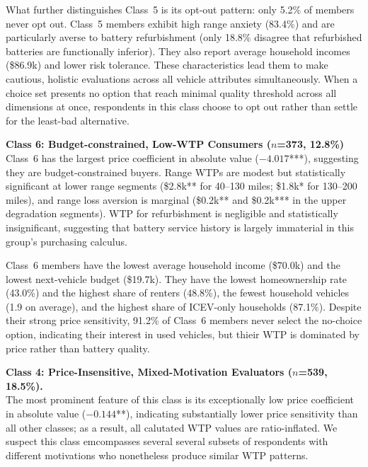 \documentclass[a4paper,fleqn]{cas-sc}   %
\begin{document}
What further distinguishes Class~5 is its opt-out pattern: only 5.2\% of members never opt out. Class~5 members exhibit high range anxiety (83.4\%) and are particularly averse to battery refurbishment (only 18.8\% disagree that refurbished batteries are functionally inferior). They also report average household incomes (\$86.9k) and lower risk tolerance. These characteristics lead them to make cautious, holistic evaluations across all vehicle attributes simultaneously. When a choice set presents no option that reach minimal quality threshold across all dimensions at once, respondents in this class choose to opt out rather than settle for the least-bad alternative.

\medskip

\noindent\textbf{Class 6: Budget-constrained, Low-WTP Consumers ($n$=373, 12.8\%)}\\
Class~6 has the largest price coefficient in absolute value ($-4.017$***), suggesting they are budget-constrained buyers. Range WTPs are modest but statistically significant at lower range segments (\$2.8k** for 40--130 miles; \$1.8k* for 130--200 miles), and range loss aversion is marginal (\$0.2k** and \$0.2k*** in the upper degradation segments). WTP for refurbishment is negligible and statistically insignificant, suggesting that battery service history is largely immaterial in this group's purchasing calculus.

Class~6 members have the lowest average household income (\$70.0k) and the lowest next-vehicle budget (\$19.7k). They have the lowest homeownership rate (43.0\%) and the highest share of renters (48.8\%), the fewest household vehicles (1.9 on average), and the highest share of ICEV-only households (87.1\%). Despite their strong price sensitivity, 91.2\% of Class~6 members never select the no-choice option, indicating their interest in used vehicles, but thieir WTP is dominated by price rather than battery quality.

\medskip

\noindent\textbf{Class 4: Price-Insensitive, Mixed-Motivation Evaluators ($n$=539, 18.5\%).}\\
The most prominent feature of this class is its exceptionally low price coefficient in absolute value ($-0.144$**), indicating substantially lower price sensitivity than all other classes; as a result, all calutated WTP values are ratio-inflated. We suspect this class emcompasses several several subsets of respondents with different motivations who nonetheless produce similar WTP patterns.
\end{document}
